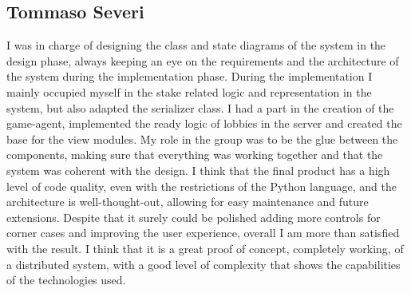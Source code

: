 \documentclass{scrartcl}
\begin{document}
\subsection{Tommaso Severi}\label{tommaso-severi}
I was in charge of designing the class and state diagrams of the system in the design phase, always
keeping an eye on the requirements and the architecture of the system during the implementation phase.
During the implementation I mainly occupied myself in the stake related logic and representation in the 
system, but also adapted the serializer class. I had a part in the creation of the game-agent,
implemented the ready logic of lobbies in the server and created the base for the view modules.
My role in the group was to be the glue between the components, making sure that everything
was working together and that the system was coherent with the design.
I think that the final product has a high level of code quality, even with the restrictions of the
Python language, and the architecture is well-thought-out, allowing for easy maintenance and
future extensions. Despite that it surely could be polished adding more controls for corner 
cases and improving the user experience, overall I am more than satisfied with the result. I think 
that it is a great proof of concept, completely working, of a distributed system, with a good level of
complexity that shows the capabilities of the technologies used.



\end{document}
